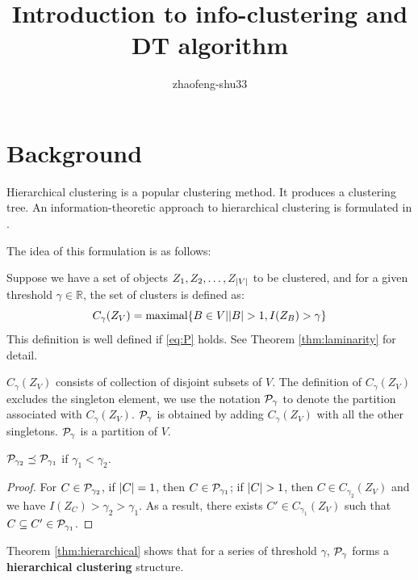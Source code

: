 \documentclass{article}
\begin{document}
\title{Introduction to info-clustering and DT algorithm}
\author{zhaofeng-shu33}
\maketitle
\section{Background}
Hierarchical clustering is a popular clustering method. It produces a clustering tree. 
An information-theoretic approach to hierarchical clustering is formulated in \cite{ic}.

The idea of this formulation is as follows:

Suppose we have a set of objects $Z_1, Z_2, \dots, Z_{\abs{V}}$ to be clustered, and for a given threshold $\gamma \in \mathbb{R}$, the set of clusters is defined as:
\begin{equation}\label{eq:def_CgammaZV}
C_{\gamma}(Z_V) = \textrm{maximal}\{ B \in V \vert \abs{B} > 1, I(Z_B) > \gamma \}
\end{equation}
This definition is well defined if \eqref{eq:P} holds. See Theorem \ref{thm:laminarity} for detail.

$C_{\gamma}(Z_V)$ consists of collection of disjoint subsets of $V$.
The definition of $C_{\gamma}(Z_V)$ excludes the singleton element,
we use the notation $\P_{\gamma}$ to denote the partition associated with $C_{\gamma}(Z_V)$. $\P_{\gamma}$ is obtained by adding $C_{\gamma}(Z_V)$ with all the other singletons.
$\P_{\gamma}$ is a partition of $V$.

\begin{theorem}\label{thm:hierarchical}
$\P_{\gamma_2} \preceq \P_{\gamma_1}$ if $\gamma_1 < \gamma_2$.
\end{theorem}
\begin{proof}
For $C \in \P_{\gamma_2}$, if $\abs{C}=1$, then  $C\in \P_{\gamma_1}$;
if $\abs{C}>1$, then $C \in C_{\gamma_2}(Z_V)$ and we have $I(Z_C) > \gamma_2 > \gamma_1$.
As a result, there exists $C' \in C_{\gamma_1}(Z_V)$ such that $C\subseteq C' \in \P_{\gamma_1}$.
\end{proof}
\begin{remark}
Theorem \ref{thm:hierarchical} shows that for a series of threshold $\gamma$, $\P_{\gamma}$ forms a \textbf{hierarchical clustering} structure.
\end{remark}
\end{document}
